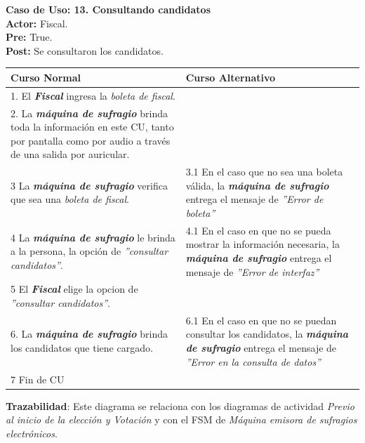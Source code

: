 \documentclass[spanish, 10pt,a4paper]{article}
\numberwithin{equation}{section} %
\begin{document}
\clearpage
\noindent\textbf{Caso de Uso: 13. Consultando candidatos}\\
\textbf{Actor: } Fiscal.\\
\textbf{Pre: } True.\\
\textbf{Post: } Se consultaron los candidatos.\\
\begin{table}[H]
  \centering
\bgroup
\def\arraystretch{1.3}
  \begin{tabular}{p{9cm} | p{7cm}}
    \hline
    Curso Normal & Curso Alternativo \\
    \hline
    \hline    
    1. El \textbf{\textit{Fiscal}} ingresa la \textit{boleta de fiscal}. 
    & \\
    
    \hline
    2. La \textbf{\textit{máquina de sufragio}} brinda toda la información en este CU, tanto por pantalla como por audio a través de una salida por auricular.
    &
    \\
    
    \hline
    3 La \textbf{\textit{máquina de sufragio}} verifica que sea una \textit{boleta de fiscal}.
    & 
    3.1 En el caso que no sea una boleta válida, la \textbf{\textit{máquina de sufragio}} entrega el mensaje de \textit{''Error de boleta''}
    \\
    
    \hline
    4 La \textbf{\textit{máquina de sufragio}} le brinda a la persona, la opción de \textit{''consultar candidatos''}.
    & 
    4.1 En el caso en que no se pueda mostrar la información necesaria, la \textbf{\textit{máquina de sufragio}} entrega el mensaje de \textit{''Error de interfaz''}
    \\
    
    \hline
    5 El \textbf{\textit{Fiscal}} elige la opcion de \textit{''consultar candidatos''}.
    & \\
    
    \hline
    6. La \textbf{\textit{máquina de sufragio}} brinda los candidatos que tiene cargado.
    &
    6.1 En el caso en que no se puedan consultar los candidatos, la \textbf{\textit{máquina de sufragio}} entrega el mensaje de \textit{''Error en la consulta de datos''}
    \\
    
    \hline
    7 Fin de CU
    & \\
    \hline
  \end{tabular}
\egroup
\end{table}
\vspace{-10px}
\noindent\textbf{Trazabilidad}: Este diagrama se relaciona con los diagramas de actividad \textit{Previo al inicio de la elección y Votación} y con el FSM de \textit{Máquina emisora de sufragios electrónicos}.\\
\end{document}
